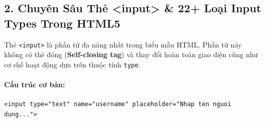 \documentclass[11pt,oneside]{book}
\newcommand{\codeinline}[1]{\textcolor{accentOrange}{\texttt{#1}}}
\newcommand{\term}[1]{\textbf{\textcolor{primaryBlue}{#1}}}
\begin{document}
\subsection{2. Chuyên Sâu Thẻ <input> \& 22+ Loại Input Types Trong HTML5}

Thẻ \codeinline{<input>} là phần tử đa năng nhất trong biểu mẫu HTML. Phần tử này không có thẻ đóng (\term{Self-closing tag}) và thay đổi hoàn toàn giao diện cũng như cơ chế hoạt động dựa trên thuộc tính \codeinline{type}.

\paragraph{Cấu trúc cơ bản:}
\begin{codeWindow}
\begin{lstlisting}[language=HTML5]
<input type="text" name="username" placeholder="Nhap ten nguoi dung...">
\end{lstlisting}
\end{codeWindow}
\end{document}
